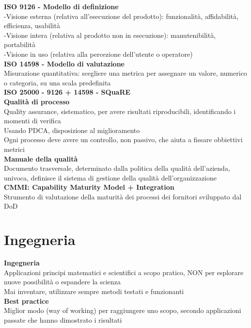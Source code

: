 \documentclass{article}
\begin{document}
		\textbf{ISO 9126 - Modello di definizione}\\
		-Visione esterna (relativa all'esecuzione del prodotto): funzionalità, affidabilità, efficienza, usabilità\\
		-Visione intera (relativa al prodotto non in esecuzione): manutenibilità, portabilità\\
		-Visione in uso (relativa alla percezione dell'utente o operatore)\\
		
		\textbf{ISO 14598 - Modello di valutazione}\\
		Misurazione quantitativa: scegliere una metrica per assegnare un valore, numerico o categoria, su una scala predefinita\\
		
		\textbf{ISO 25000 - 9126 + 14598 - SQuaRE}\\
		
		\textbf{Qualità di processo}\\
		Quality assurance, sistematico, per avere risultati riproducibili, identificando i momenti di verifica\\
		Usando PDCA, disposizione al miglioramento\\
		Ogni processo deve avere un controllo, non passivo, che aiuta a fissare obbiettivi metrici\\
		
		\textbf{Manuale della qualità}\\
		Documento trasversale, determinato dalla politica della qualità dell'azienda, univoca, definisce il sistema di gestione della qualità dell'organizzazione\\
		
		\textbf{CMMI: Capability Maturity Model + Integration}\\
		Strumento di valutazione della maturità dei processi dei fornitori sviluppato dal DoD\\
			
	\clearpage
	\section{Ingegneria}
		\textbf{Ingegneria}\\
			Applicazioni principi matematici e scientifici a scopo pratico, NON per esplorare nuove possibilità o espandere la scienza\\
			Mai inventare, utilizzare sempre metodi testati e funzionanti\\
			
		\textbf{Best practice}\\
		Miglior modo (way of working) per raggiungere uno scopo, secondo applicazioni passate che hanno dimostrato i risultati\\
		
\end{document}
